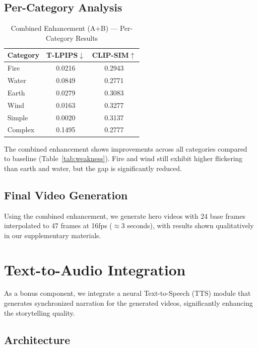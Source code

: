 \documentclass[conference]{IEEEtran}
\begin{document}
\subsection{Per-Category Analysis}

\begin{table}[h]
\centering
\caption{Combined Enhancement (A+B) — Per-Category Results}
\begin{tabular}{lcc}
\toprule
\textbf{Category} & \textbf{T-LPIPS}$\downarrow$ & \textbf{CLIP-SIM}$\uparrow$ \\
\midrule
Fire & 0.0216 & 0.2943 \\
Water & 0.0849 & 0.2771 \\
Earth & 0.0279 & 0.3083 \\
Wind & 0.0163 & 0.3277 \\
\midrule
Simple & 0.0020 & 0.3137 \\
Complex & 0.1495 & 0.2777 \\
\bottomrule
\end{tabular}
\label{tab:percategory}
\end{table}

The combined enhancement shows improvements across all categories compared to baseline (Table~\ref{tab:weakness}). Fire and wind still exhibit higher flickering than earth and water, but the gap is significantly reduced.

\subsection{Final Video Generation}

Using the combined enhancement, we generate hero videos with 24 base frames interpolated to 47 frames at 16fps ($\approx$3 seconds), with results shown qualitatively in our supplementary materials.

\section{Text-to-Audio Integration}

As a bonus component, we integrate a neural Text-to-Speech (TTS) module that generates synchronized narration for the generated videos, significantly enhancing the storytelling quality.

\subsection{Architecture}
\end{document}

